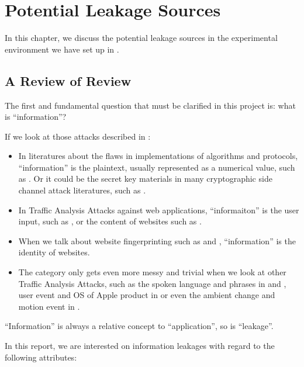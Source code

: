 \chapter{Potential Leakage Sources}

In this chapter, we discuss the potential leakage sources in the experimental environment we have set up in . 

\section{A Review of Review} \label{Sec: A Review of Review}

The first and fundamental question that must be clarified in this project is: what is ``information''?

If we look at those attacks described in :

\begin{itemize}
	\item In literatures about the flaws in implementations of algorithms and protocols, ``information'' is the plaintext, usually represented as a numerical value, such as \cite{802154sec} \cite{rfc7457} \cite{CompressionRatioAttack} \cite{PaddingOracle}. Or it could be the secret key materials in many cryptographic side channel attack literatures, such as \cite{DPA}.
	\item In Traffic Analysis Attacks against web applications, ``informaiton'' is the user input, such as \cite{PinpointWeb} \cite{SearchAttack}, or the content of websites such as \cite{WebSideChannel}.
	\item When we talk about website fingerprinting such as \cite{WebsiteFingerprint} \cite{Peekaboo} and \cite{PClassifier}, ``information'' is the identity of websites. 
	\item The category only gets even more messy and trivial when we look at other Traffic Analysis Attacks, such as the spoken language and phrases in \cite{VoIPLanguage} and \cite{VoIPPhrases}, user event and OS of Apple product in \cite{AppleMessage} or even the ambient change and motion event in \cite{Video}.
\end{itemize}

``Information'' is always a relative concept to ``application'', so is ``leakage''. 

In this report, we are interested on information leakages with regard to the following attributes:

